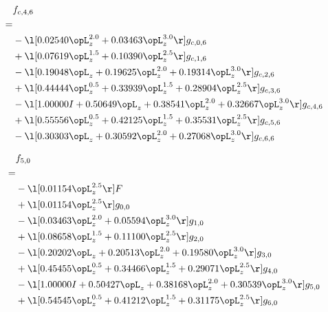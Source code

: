 \begin{alignat}{2} 
\label{eq:f_46_0} 
& f_{c,4,6} \nonumber \\ 
 = \\ 
& - \l[  0.02540 \opL_z^{2.0} +  0.03463 \opL_z^{3.0}  \r] g_{c,0,6} \nonumber \\ 
& + \l[  0.07619 \opL_z^{1.5} +  0.10390 \opL_z^{2.5}  \r] g_{c,1,6} \nonumber \\ 
& - \l[  0.19048 \opL_z +  0.19625 \opL_z^{2.0} +  0.19314 \opL_z^{3.0}  \r] g_{c,2,6} \nonumber \\ 
& + \l[  0.44444 \opL_z^{0.5} +  0.33939 \opL_z^{1.5} +  0.28904 \opL_z^{2.5}  \r] g_{c,3,6} \nonumber \\ 
& - \l[  1.00000 I +  0.50649 \opL_z +  0.38541 \opL_z^{2.0} +  0.32667 \opL_z^{3.0}  \r] g_{c,4,6} \nonumber \\ 
& + \l[  0.55556 \opL_z^{0.5} +  0.42125 \opL_z^{1.5} +  0.35531 \opL_z^{2.5}  \r] g_{c,5,6} \nonumber \\ 
& - \l[  0.30303 \opL_z +  0.30592 \opL_z^{2.0} +  0.27068 \opL_z^{3.0}  \r] g_{c,6,6} \nonumber \\ 
\end{alignat} 


\begin{alignat}{2} 
\label{eq:f_50_0} 
& f_{5,0} \nonumber \\ 
 = \\ 
& - \l[  0.01154 \opL_z^{2.5}  \r] F \nonumber \\ 
& + \l[  0.01154 \opL_z^{2.5}  \r] g_{0,0} \nonumber \\ 
& - \l[  0.03463 \opL_z^{2.0} +  0.05594 \opL_z^{3.0}  \r] g_{1,0} \nonumber \\ 
& + \l[  0.08658 \opL_z^{1.5} +  0.11100 \opL_z^{2.5}  \r] g_{2,0} \nonumber \\ 
& - \l[  0.20202 \opL_z +  0.20513 \opL_z^{2.0} +  0.19580 \opL_z^{3.0}  \r] g_{3,0} \nonumber \\ 
& + \l[  0.45455 \opL_z^{0.5} +  0.34466 \opL_z^{1.5} +  0.29071 \opL_z^{2.5}  \r] g_{4,0} \nonumber \\ 
& - \l[  1.00000 I +  0.50427 \opL_z +  0.38168 \opL_z^{2.0} +  0.30539 \opL_z^{3.0}  \r] g_{5,0} \nonumber \\ 
& + \l[  0.54545 \opL_z^{0.5} +  0.41212 \opL_z^{1.5} +  0.31175 \opL_z^{2.5}  \r] g_{6,0} \nonumber \\ 
\end{alignat} 



